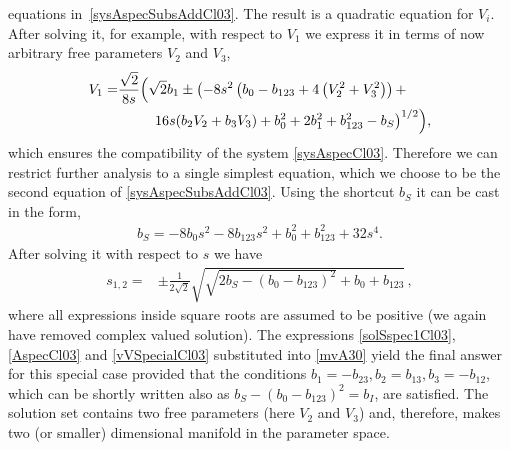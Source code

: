 \documentclass{birkjour}
\begin{document}
equations in~\eqref{sysAspecSubsAddCl03}. The result is a
quadratic equation for $V_i$. After solving it, for example, with
respect to $V_1$ we express it in terms of now arbitrary free
parameters $V_2$ and $V_3$,
\begin{equation}\begin{split}\label{AspecCl03}
  V_{1}=& \frac{\sqrt{2}}{8 s}\Bigl(\sqrt{2} b_{1}\pm \bigl(-8 s^2 \left(b_{0}-b_{123}+4 \left(V_{2}^2+V_{3}^2\right)\right)+\\
  &\phantom{\bigl(-8 s^2 }
  16 s (b_{2} V_{2}+b_{3} V_{3})+b_{0}^2+2 b_{1}^2+b_{123}^2-b_{S}\bigr)^{1/2}\Bigr),
\end{split}\end{equation}
which ensures the compatibility of the system
\eqref{sysAspecCl03}. Therefore we can restrict further analysis
to a single simplest equation, which we choose to be the second
equation of \eqref{sysAspecSubsAddCl03}. Using the shortcut $b_S$
it can be cast in the form,
  \begin{equation}\begin{split}\label{sysAspec2Cl03}
b_{S}=-8 b_{0} s^2-8 b_{123} s^2+b_{0}^2+b_{123}^2+32 s^4 .
 \end{split}\end{equation}
After solving it with respect to $s$ we have
\begin{equation}\begin{split}\label{solSspec1Cl03}
s_{1,2} =& \pm\tfrac{1}{2 \sqrt{2}}\sqrt{\sqrt{2
b_{S}-(b_{0}-b_{123})^2}+b_{0}+b_{123}}\,,
\end{split}\end{equation}
where all expressions inside square roots are assumed to be
positive (we again have removed complex valued solution). The
expressions \eqref{solSspec1Cl03}, \eqref{AspecCl03} and
\eqref{vVSpecialCl03} substituted into \eqref{mvA30} yield the
final answer for this special case provided that the conditions
$b_1 =- b_{23},  b_2 = b_{13},  b_3= - b_{12}$, which can be
shortly written also as $b_S-(b_0-b_{123})^2=b_I$, are satisfied. The
solution set contains two free parameters (here $V_2$ and $V_3$)
and, therefore, makes two (or smaller) dimensional manifold in
the parameter space.
\end{document}
